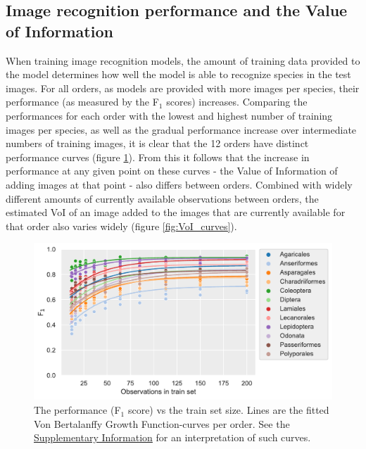 \documentclass{article}
\begin{document}
\subsection*{Image recognition performance and the Value of Information}
When training image recognition models, the amount of training data provided to the model determines how well the model is able to recognize species in the test images. For all orders, as models are provided with more images per species, their performance (as measured by the F\(_1\) scores) increases. Comparing the performances for each order with the lowest and highest number of training images per species, as well as the gradual performance increase over intermediate numbers of training images, it is clear that the 12 orders have distinct performance curves (figure \ref{fig:F1_curves}). From this it follows that the increase in performance at any given point on these curves - the Value of Information of adding images at that point - also differs between orders. Combined with widely different amounts of currently available observations between orders, the estimated VoI of an image added to the images that are currently available for that order also varies widely (figure \ref{fig:VoI_curves}).

\begin{figure}[!ht]
  \includegraphics[width=\textwidth]{2}
  \caption{\footnotesize The performance (F\(_1\) score) vs the train set size. Lines are the fitted Von Bertalanffy Growth Function-curves per order. See the \hyperref[fig:vbgf]{Supplementary Information} for an interpretation of such curves.
  }
  \label{fig:F1_curves}
\end{figure}
\end{document}
